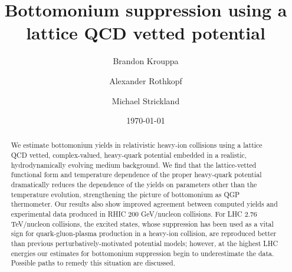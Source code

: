 \documentclass[showpacs,aps,prd,preprint,nofootinbib,showkeys,unsortedaddress,raggedbottom]{revtex4-1}
\begin{document}
\title{Bottomonium suppression using a lattice QCD vetted potential}


\author{Brandon Krouppa} 

\author{Alexander Rothkopf} 

\author{Michael Strickland} 

\begin{abstract}
We estimate bottomonium yields in relativistic heavy-ion collisions using a lattice QCD vetted, complex-valued, heavy-quark potential embedded in a realistic, hydrodynamically evolving medium background. We find that the lattice-vetted functional form and temperature dependence of the proper heavy-quark potential dramatically reduces the dependence of the yields on parameters other than the temperature evolution, strengthening the picture of bottomonium as QGP thermometer. Our results also show improved agreement between computed yields and experimental data produced in RHIC 200 GeV/nucleon collisions. For LHC 2.76 TeV/nucleon collisions, the excited states, whose suppression has been used as a vital sign for quark-gluon-plasma production in a heavy-ion collision, are reproduced better than previous perturbatively-motivated potential models; however, at the highest LHC energies our estimates for bottomonium suppression begin to underestimate the data.  Possible paths to remedy this situation are discussed.
\end{abstract}

\date{\today}



\maketitle















\end{document}
